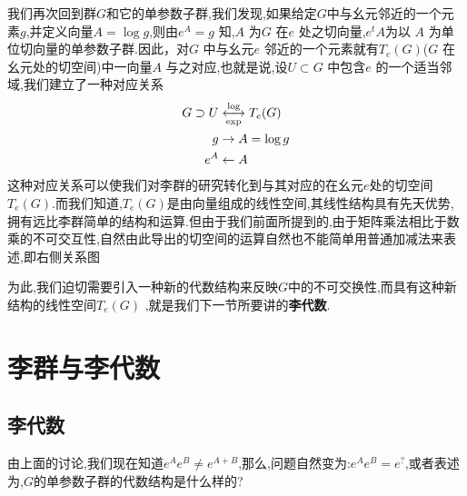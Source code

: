 我们再次回到群$G$和它的单参数子群,我们发现,如果给定$G$中与幺元邻近的一个元素$g$,并定义向量$A=\log g$,则由$e^A=g$ 知,$A$ 为$G$ 在$e$ 处之切向量,$e^tA$为以 $A$ 为单位切向量的单参数子群.因此，对$G$ 中与幺元$e$ 邻近的一个元素就有$T_{e}(G)$($G$ 在幺元处的切空间)中一向量$A$ 与之对应,也就是说,设$U\subset G$ 中包含$e$ 的一个适当邻域,我们建立了一种对应关系
\begin{equation}
    \begin{aligned}
        G\supset U&\overunderset{\log}{\exp}{\longleftrightarrow}T_{e}(G)\\g&\to A=\log g\\e^{A}&\leftarrow A
    \end{aligned}
\end{equation}
这种对应关系可以使我们对李群的研究转化到与其对应的在幺元$e$处的切空间$T_e(G)$.而我们知道,$T_e(G)$是由向量组成的线性空间,其线性结构具有先天优势,拥有远比李群简单的结构和运算.但由于我们前面所提到的,由于矩阵乘法相比于数乘的不可交互性,自然由此导出的切空间的运算自然也不能简单用普通加减法来表述,即右侧关系图

为此,我们迫切需要引入一种新的代数结构来反映$G$中的不可交换性,而具有这种新结构的线性空间$T_e(G)$
,就是我们下一节所要讲的\textbf{李代数}.
\section{李群与李代数}
\subsection{李代数}
由上面的讨论,我们现在知道$e^Ae^B\ne e^{A+B}$,那么,问题自然变为:$e^Ae^B=e^{?}$,或者表述为,$G$的单参数子群的代数结构是什么样的?

